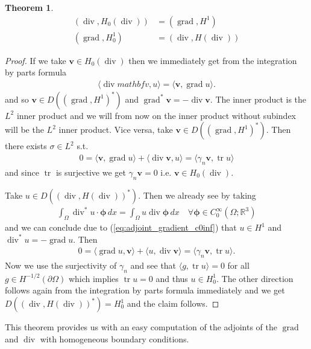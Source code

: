 \documentclass[12pt,a4paper]{article}
\numberwithin{equation}{subsection}
\numberwithin{lemma}{subsection}
\newtheorem{theorem}[lemma]{Theorem}
\theoremstyle{definition}
\DeclareMathOperator{\diver}{div}
\DeclareMathOperator{\grad}{grad}
\DeclareMathOperator{\tr}{tr}
\newcommand{\real}{\mathbb{R}}
\begin{document}
\begin{theorem}\label{thm:adjoints_grad_div_without_bc}
    \begin{align}
        (\diver, H_0(\diver)) &= (\grad, H^1) \\
        (\grad, H_0^1) &= (\diver, H(\diver))
    \end{align}
\end{theorem}
\begin{proof}
    If we take $\mathbf{v} \in H_0(\diver)$ then we immediately get 
    from the integration by parts formula
    \begin{align*}
        \langle \diver mathbf{v}, u \rangle = \langle \mathbf{v}, \grad u \rangle.
    \end{align*}
    and so $\mathbf{v} \in D((\grad, H^1)^*)$ and $\grad^* \mathbf{v} = -\diver \mathbf{v}$.
    The inner product is the $L^2$ inner product and we will from now on the inner 
    product without subindex will be the $L^2$ inner product.
    Vice versa, take $\mathbf{v} \in D((\grad, H^1)^*)$. Then there exists 
    $\sigma \in L^2$ s.t.
    \begin{align*}
        0 = \langle \mathbf{v}, \grad u \rangle + \langle \diver \mathbf{v}, u \rangle
        = \langle \gamma_n \mathbf{v}, \tr u \rangle
    \end{align*}
    and since $\tr$ is surjective we get $\gamma_n \mathbf{v} = 0$ i.e. 
    $\mathbf{v} \in H_0(\diver)$.

    Take $u \in D((\diver, H(\diver))^*)$. Then we already see by taking 
    \begin{align*}
        \int_\Omega \diver^*u \cdot \mathbf{\phi} \, dx
        = \int_\Omega u \diver \mathbf{\phi} \, dx \quad \forall \mathbf{\phi} \in C_0^\infty(\Omega;\real^3)
    \end{align*}
    and we can conclude due to (\ref{eq:adjoint_gradient_c0inf}) that $u \in H^1$ and
    $\diver^*u = -\grad u$. Then 
    \begin{align*}
        0 = \langle \grad u, \mathbf{v} \rangle
            + \langle u, \diver \mathbf{v} \rangle
        = \langle \gamma_n \mathbf{v}, \tr u \rangle.
    \end{align*}
    Now we use the surjectivity of $\gamma_n$ and see that 
    $\langle g, \tr u \rangle = 0$ for all $g \in H^{-1/2}(\partial \Omega)$ which 
    implies $\tr u = 0$ and thus $u \in H^1_0$. The other direction follows again 
    from the integration by parts formula immediately and we get 
    $D((\diver, H(\diver))^*) = H^1_0$ and the claim follows.
\end{proof}
This theorem provides us with an easy computation of the adjoints 
of the $\grad$ and $\diver$ with homogeneous boundary conditions.
\end{document}
